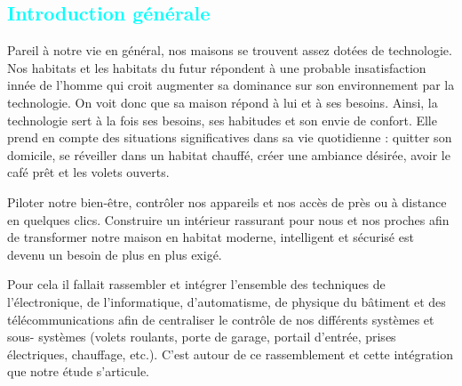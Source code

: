 
\begin{flushleft}
\section*{\textcolor{cyan}{Introduction générale}}
 Pareil à notre vie en général, nos maisons se trouvent assez
 dotées de technologie. Nos habitats et les habitats du futur
 répondent à une probable insatisfaction innée de l’homme qui
 croit augmenter sa dominance sur son environnement par la
 technologie. On voit donc que sa maison répond à lui et à ses
 besoins. Ainsi, la technologie sert à la fois ses besoins, ses
 habitudes et son envie de confort. Elle prend en compte des
 situations significatives dans sa vie quotidienne : quitter son
 domicile, se réveiller dans un habitat chauffé, créer une ambiance
 désirée, avoir le café prêt et les volets ouverts.\newline
 
 Piloter notre bien-être, contrôler nos appareils et nos accès
 de près ou à distance en quelques clics. Construire un intérieur
 rassurant pour nous et nos proches afin de transformer notre
 maison en habitat moderne, intelligent et sécurisé est devenu un
 besoin de plus en plus exigé.\newline
 
 Pour cela il fallait rassembler et intégrer l’ensemble des
 techniques de l’électronique, de l’informatique, d’automatisme,
 de physique du bâtiment et des télécommunications afin de
 centraliser le contrôle de nos différents systèmes et sous-
 systèmes (volets roulants, porte de garage, portail d’entrée,
 prises électriques, chauffage, etc.). C'est autour de ce
 rassemblement et cette intégration que notre étude s’articule.
\end{flushleft}

\newpage
	